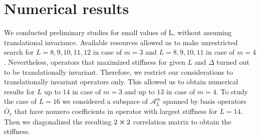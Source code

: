 \chapter{Numerical results}
\thispagestyle{chapterBeginStyle}


We conducted preliminary studies for small values of L, without assuming translational invariance. Available resources
allowed us to make unrestricted search for \(L = 8,9,10,11,12\) in case of \(m = 3\) and \(L = 8,9,10,11\) in case of
\(m = 4\). Nevertheless, operators that maximized stiffness for given \(L\) and \(\Delta\) turned out to be translationally
invariant. Therefore, we restrict our considerations to translationally invariant operators only. This allowed us
to obtain numerical results for \(L\) up to \(14\) in case of \(m = 3\) and up to \(13\) in case of \(m = 4\).
To study the case of  \(L = 16\) we considered a subspace of \(\mathcal{A}_L^m\) spanned by basis operators
\(\overline{O}_{\underline{s}}\) that have nonzero coefficients in operator with largest stiffness for \(L = 14\). 
Then we diagonalized the resulting \(2\cross 2\) correlation matrix to obtain the stiffness.

